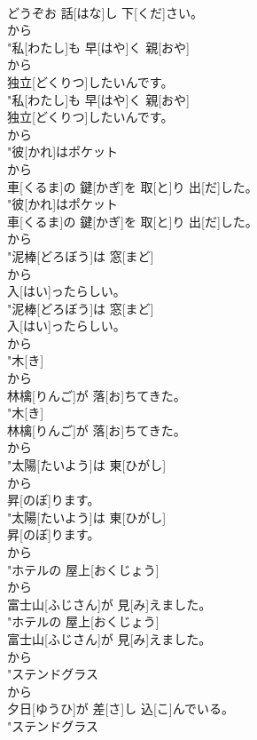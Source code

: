 \documentclass[8pt]{extreport}
\begin{document}
\begin{CJK}{UTF8}{min}
\\	どうぞお 話[はな]し 下[くだ]さい。
\\	から
\\	"私[わたし]も 早[はや]く 親[おや]
\\	から
\\	独立[どくりつ]したいんです。
\\	"私[わたし]も 早[はや]く 親[おや]
\\	独立[どくりつ]したいんです。
\\	から
\\	"彼[かれ]はポケット
\\	から
\\	車[くるま]の 鍵[かぎ]を 取[と]り 出[だ]した。
\\	"彼[かれ]はポケット
\\	車[くるま]の 鍵[かぎ]を 取[と]り 出[だ]した。
\\	から
\\	"泥棒[どろぼう]は 窓[まど]
\\	から
\\	入[はい]ったらしい。
\\	"泥棒[どろぼう]は 窓[まど]
\\	入[はい]ったらしい。
\\	から
\\	"木[き]
\\	から
\\	林檎[りんご]が 落[お]ちてきた。
\\	"木[き]
\\	林檎[りんご]が 落[お]ちてきた。
\\	から
\\	"太陽[たいよう]は 東[ひがし]
\\	から
\\	昇[のぼ]ります。
\\	"太陽[たいよう]は 東[ひがし]
\\	昇[のぼ]ります。
\\	から
\\	"ホテルの 屋上[おくじょう]
\\	から
\\	富士山[ふじさん]が 見[み]えました。
\\	"ホテルの 屋上[おくじょう]
\\	富士山[ふじさん]が 見[み]えました。
\\	から
\\	"ステンドグラス
\\	から
\\	夕日[ゆうひ]が 差[さ]し 込[こ]んでいる。
\\	"ステンドグラス

\end{CJK}
\end{document}
